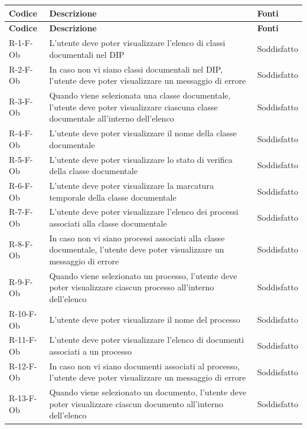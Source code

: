 \begin{longtable}{|p{2.5cm}|p{9.5cm}|p{2.5cm}|}
\hline
\rowcolor{zpusgreen!30}
\textbf{Codice} & \textbf{Descrizione} & \textbf{Fonti} \\
\hline
\endfirsthead
\rowcolor{zpusgreen!30}
\textbf{Codice} & \textbf{Descrizione} & \textbf{Fonti} \\
\hline
\endhead
R-1-F-Ob & L'utente deve poter visualizzare l'elenco di classi documentali nel DIP & Soddisfatto \\
\hline
R-2-F-Ob & In caso non vi siano classi documentali nel DIP, l'utente deve poter visualizzare un messaggio di errore & Soddisfatto \\
\hline
R-3-F-Ob & Quando viene selezionata una classe documentale, l'utente deve poter visualizzare ciascuna classe documentale all'interno dell'elenco & Soddisfatto \\
\hline
R-4-F-Ob & L'utente deve poter visualizzare il nome della classe documentale & Soddisfatto \\
\hline
R-5-F-Ob & L'utente deve poter visualizzare lo stato di verifica della classe documentale & Soddisfatto \\
\hline
R-6-F-Ob & L'utente deve poter visualizzare la marcatura temporale della classe documentale & Soddisfatto \\
\hline
R-7-F-Ob & L'utente deve poter visualizzare l'elenco dei processi associati alla classe documentale & Soddisfatto \\
\hline
R-8-F-Ob & In caso non vi siano processi associati alla classe documentale, l'utente deve poter visualizzare un messaggio di errore & Soddisfatto \\
\hline
R-9-F-Ob & Quando viene selezionato un processo, l'utente deve poter visualizzare ciascun processo all'interno dell'elenco & Soddisfatto \\
\hline
R-10-F-Ob & L'utente deve poter visualizzare il nome del processo & Soddisfatto \\
\hline
R-11-F-Ob & L'utente deve poter visualizzare l'elenco di documenti associati a un processo & Soddisfatto \\
\hline
R-12-F-Ob & In caso non vi siano documenti associati al processo, l'utente deve poter visualizzare un messaggio di errore & Soddisfatto \\
\hline
R-13-F-Ob & Quando viene selezionato un documento, l'utente deve poter visualizzare ciascun documento all'interno dell'elenco & Soddisfatto \\
\hline

\end{longtable}
